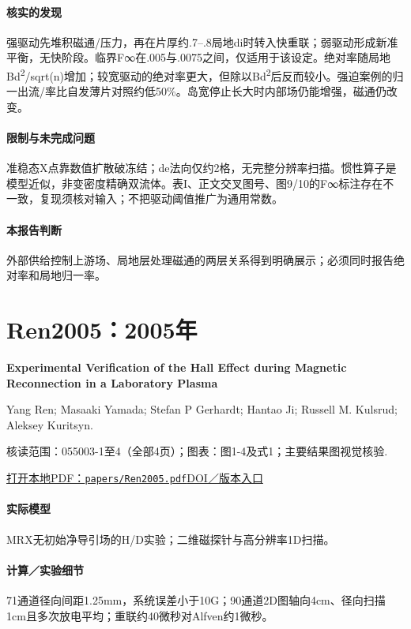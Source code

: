 \paragraph{核实的发现}强驱动先堆积磁通/压力，再在片厚约.7–.8局地di时转入快重联；弱驱动形成新准平衡，无快阶段。临界F∞在.005与.0075之间，仅适用于该设定。绝对率随局地Bd\textsuperscript{2}/sqrt(n)增加；较宽驱动的绝对率更大，但除以Bd\textsuperscript{2}后反而较小。强迫案例的归一出流/率比自发薄片对照约低50\%。岛宽停止长大时内部场仍能增强，磁通仍改变。

\paragraph{限制与未完成问题}准稳态X点靠数值扩散破冻结；de法向仅约2格，无完整分辨率扫描。惯性算子是模型近似，非变密度精确双流体。表I、正文交叉图号、图9/10的F∞标注存在不一致，复现须核对输入；不把驱动阈值推广为通用常数。

\paragraph{本报告判断}外部供给控制上游场、局地层处理磁通的两层关系得到明确展示；必须同时报告绝对率和局地归一率。

\section{Ren2005：2005年}\label{paper:Ren2005}

\textbf{Experimental Verification of the Hall Effect during Magnetic Reconnection in a Laboratory Plasma}\citep{Ren2005}\

Yang Ren;  Masaaki Yamada;  Stefan P Gerhardt;  Hantao Ji;  Russell M. Kulsrud;  Aleksey Kuritsyn.

\textsf{核读范围：}055003-1至4（全部4页）；\textsf{图表：}图1-4及式1；主要结果图视觉核验.

\href{run:papers/Ren2005.pdf}{打开本地PDF：\texttt{papers/Ren2005.pdf}}\quad\href{https://doi.org/10.1103/physrevlett.95.055003}{DOI／版本入口}

\paragraph{实际模型}MRX无初始净导引场的H/D实验；二维磁探针与高分辨率1D扫描。

\paragraph{计算／实验细节}71通道径向间距1.25mm，系统误差小于10G；90通道2D图轴向4cm、径向扫描1cm且多次放电平均；重联约40微秒对Alfven约1微秒。

